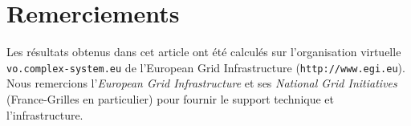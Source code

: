 \documentclass[11pt]{article}
\begin{document}
\section*{Remerciements}

Les résultats obtenus dans cet article ont été calculés sur l'organisation virtuelle \texttt{vo.complex-system.eu} de l'European Grid Infrastructure (\texttt{http://www.egi.eu}). Nous remercions l'\textit{European Grid Infrastructure} et ses \textit{National Grid Initiatives} (France-Grilles en particulier) pour fournir le support technique et l'infrastructure.











\end{document}
